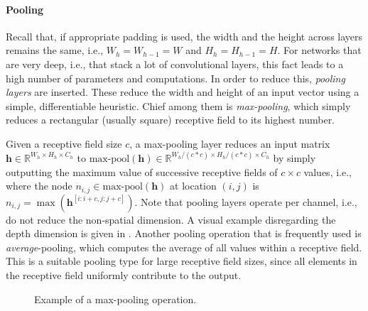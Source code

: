 \paragraph{Pooling}
\label{p:pooling}
Recall that, if appropriate padding is used, the width and the height across layers remains the same, i.e., $W_h=W_{h-1}=W$ and $H_h=H_{h-1}=H$. For networks that are very deep, i.e., that stack a lot of convolutional layers, this fact leads to a high number of parameters and computations. In order to reduce this, \emph{pooling layers} are inserted. These reduce the width and height of an input vector using a simple, differentiable heuristic. Chief among them is \emph{max-pooling}, which simply reduces a rectangular (usually square) receptive field to its highest number.

Given a receptive field size $c$, a max-pooling layer reduces an input matrix $\textbf{h}\in\mathbb{R}^{W_h\times H_h\times C_h}$ to $\text{max-pool}(\textbf{h})\in\mathbb{R}^{W_h/(c*c)\times H_h/(c*c)\times C_h}$ by simply outputting the maximum value of successive receptive fields of $c\times c$ values, i.e., where the node $n_{i,j}\in\text{max-pool}(\textbf{h})$ at location $(i,j)$ is $n_{i,j}=\max(\textbf{h}^{[i:i+c,j:j+c]})$. Note that pooling layers operate per channel, i.e., do not reduce the non-spatial dimension. A visual example disregarding the depth dimension is given in . Another pooling operation that is frequently used is \emph{average}-pooling, which computes the average of all values within a receptive field. This is a suitable pooling type for large receptive field sizes, since all elements in the receptive field uniformly contribute to the output.

\begin{figure}
    \centering
    \caption{Example of a max-pooling operation.}
    \label{fig:maxpool}
\end{figure}

